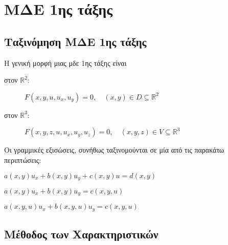 



\geometry{top=1cm}

\pagestyle{vangelis}
\everymath{\displaystyle}
\setcounter{chapter}{1}



\chapter*{ΜΔΕ 1ης τάξης}

\section*{Ταξινόμηση ΜΔΕ 1ης τάξης}

Η γενική μορφή μιας μδε 1ης τάξης είναι 
\begin{description}
  \item [στον $\mathbb{R}^{2}$:] $ F(x,y,u,u_{x},u_{y}) = 0, \quad (x,y) \in D 
    \subseteq \mathbb{R}^{2} $  
  \item [στον $\mathbb{R}^{3}:$] $ F(x,y,z,u,u_{x},u_{y},u_{z}) = 0, \quad (x,y,z) \in V 
    \subseteq \mathbb{R}^{3} $ 
\end{description} 

Οι γραμμικές εξισώσεις, συνήθως ταξινομούνται σε μία από τις παρακάτω περιπτώσεις:
\begin{description}
  [widest=Σχεδον Γραμμικες:,labelindent=1em,labelsep*=1em, itemindent=0pt,leftmargin=*]
\item [Γραμμικές:] $ a(x,y)u_{x}+b(x,y)u_{y}+c(x,y)u=d(x,y) $
\item [Σχεδόν Γραμμικές:] $ a(x,y)u_{x}+b(x,y)u_{y}=c(x,y,u) $
\item [Ημιγραμμικές:] $ a(x,y,u)u_{x}+b(x,y,u)u_{y}=c(x,y,u) $
\end{description}

\section*{Μέθοδος των Χαρακτηριστικών}


